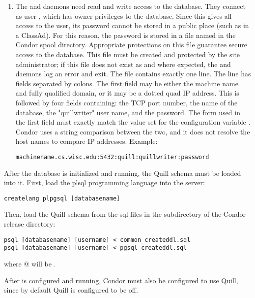 \begin{enumerate}
\item The  and  daemons need read and write access
to the database.
They connect as user ,
which has owner privileges to the database.
Since this gives all access to the  user,
its password cannot be stored in a public place 
(such as in a ClassAd).
For this reason, the  password is stored
in a file named  in the Condor spool directory.
Appropriate protections on this file guarantee secure access to the database.
This file must be created and protected by the site administrator;
if this file does not exist as and where expected, the 
and  daemons log an error and exit.
The  file contains exactly one line.
The line has fields separated by colons.
The first field may be either the machine name and fully qualified domain,
or it may be a dotted quad IP address.
This is followed by four fields containing:
the TCP port number, 
the name of the database,
the "quillwriter" user name,
and the password.
The form used in the first field must exactly match the value set for 
the configuration variable .
Condor uses a string comparison between the two, and it does not resolve the
host names to compare IP addresses.
Example:
\footnotesize
\begin{verbatim}
machinename.cs.wisc.edu:5432:quill:quillwriter:password
\end{verbatim}
\normalsize

\end{enumerate}

After the  database is initialized and running, 
the Quill schema
must be loaded into it.  First, load the plsql programming language
into the server:

\begin{verbatim}
createlang plpgsql [databasename]
\end{verbatim}

Then, load the Quill schema from the sql files in the  subdirectory
of the Condor release directory:

\begin{verbatim}
psql [databasename] [username] < common_createddl.sql
psql [databasename] [username] < pgsql_createddl.sql
\end{verbatim}
where \verb@[username]@ will be \verb@quillwriter@.


After  is configured and running, Condor must also be
configured to use Quill, since by default Quill is configured to be off.

